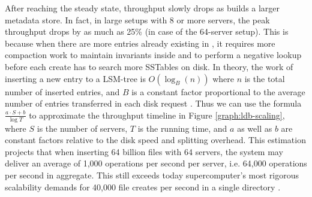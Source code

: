 After reaching the steady state, throughput slowly drops
as \tfs builds a larger metadata store.
In fact, in large setups with 8 or more servers,
the peak throughput drops by as much as 25\% (in case of the 64-server setup).
This is because when there are more entries already existing in \tfs,
it requires more compaction work to maintain invariants inside \ldb
and to perform a negative lookup before each create
has to search more SSTables on disk.
In theory, the work of inserting a new entry to a LSM-tree is $O(\log_{B}(n))$
where $n$ is the total number of inserted entries, and $B$ is a constant factor
proportional to the average number of entries transferred in each disk request
\cite{Bender2007}.
Thus we can use the formula $\frac{a\cdot S+b}{\log{T}}$ to
approximate the throughput timeline in Figure \ref{graph:ldb-scaling},
where $S$ is the number of servers, $T$ is the running time,
and $a$ as well as $b$ are constant factors
relative to the disk speed and splitting overhead.
This estimation projects that when inserting 64 billion files with 64 servers,
the system may deliver an average of 1,000 operations per second per server,
i.e. 64,000 operations per second in aggregate.
This still exceeds today supercomputer's most rigorous scalability demands for
40,000 file creates per second in a single directory \cite{hpcs-io:2008}.

